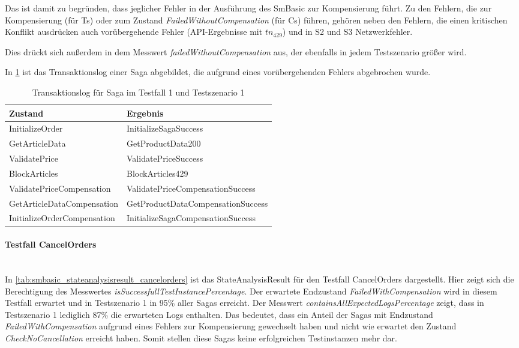 Das ist damit zu begründen, dass jeglicher Fehler in der Ausführung des SmBasic zur Kompensierung führt. Zu den Fehlern, die zur Kompensierung (für Ts) oder zum Zustand \textit{FailedWithoutCompensation} (für Cs) führen, gehören neben den Fehlern, die einen kritischen Konflikt ausdrücken auch vorübergehende Fehler (API-Ergebnisse mit $tn_{429}$) und in S2 und S3 Netzwerkfehler. 

Dies drückt sich außerdem in dem Messwert \textit{failedWithoutCompensation} aus, der ebenfalls in jedem Testszenario größer wird.

In \cref{tab:transaktionslog_ts1_tc1_429} ist das Transaktionslog einer Saga abgebildet, die aufgrund eines vorübergehenden Fehlers abgebrochen wurde. 

\begin{center}
	\fontsize{9}{12}\selectfont
	\begin{longtable}[h]{|p{4.5cm}|p{7cm}|}
		\hline
		Zustand & Ergebnis \\* \hline
		\endhead
		\hline
		\caption{Transaktionslog für Saga im Testfall 1 und Testszenario 1}
		\label{tab:transaktionslog_ts1_tc1_429}
		\endfoot
  		InitializeOrder & InitializeSagaSuccess \\* \hline
		GetArticleData & GetProductData200 \\* \hline
		ValidatePrice & ValidatePriceSuccess \\* \hline
		\rowcolor{Gray}
		BlockArticles & BlockArticles429 \\* \hline
		ValidatePriceCompensation & ValidatePriceCompensationSuccess \\* \hline
		GetArticleDataCompensation & GetProductDataCompensationSuccess \\* \hline
		InitializeOrderCompensation & InitializeSagaCompensationSuccess \\* \hline
	\end{longtable}
\end{center}
\FloatBarrier

\paragraph*{Testfall CancelOrders} \mbox{}\\
In \cref{tab:smbasic_stateanalysisresult_cancelorders} ist das StateAnalysisResult für den Testfall CancelOrders dargestellt. Hier zeigt sich die Berechtigung des Messwertes \textit{isSuccessfullTestInstancePercentage}. Der erwartete Endzustand \textit{FailedWithCompensation} wird in diesem Testfall erwartet und in Testszenario 1 in 95\% aller Sagas erreicht. Der Messwert \textit{containsAllExpectedLogsPercentage} zeigt, dass in Testszenario 1 lediglich 87\% die erwarteten Logs enthalten. Das bedeutet, dass ein Anteil der Sagas mit Endzustand \textit{FailedWithCompensation} aufgrund eines Fehlers zur Kompensierung gewechselt haben und nicht wie erwartet den Zustand \textit{CheckNoCancellation} erreicht haben. Somit stellen diese Sagas keine erfolgreichen Testinstanzen mehr dar.

